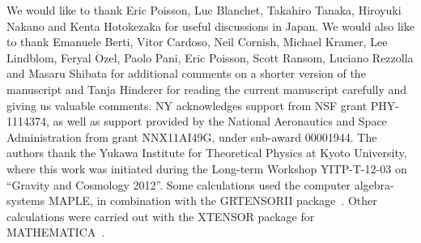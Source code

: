 \documentclass[aps,twocolumn,nofootinbib,showpacs,superscriptaddress,hyperref]{revtex4-1}
\newcommand{\mrm}{\mathrm}
\begin{document}
\acknowledgments
We would like to thank Eric Poisson, Luc Blanchet, Takahiro Tanaka, Hiroyuki Nakano and Kenta Hotokezaka for useful discussions in Japan. We would also like to thank Emanuele Berti, Vitor Cardoso, Neil Cornish, Michael Kramer, Lee Lindblom, Feryal $\ddot{\mrm{O}}$zel, Paolo Pani, Eric Poisson, Scott Ransom, Luciano Rezzolla and Masaru Shibata for additional comments on a shorter version of the manuscript and Tanja Hinderer for reading the current manuscript carefully and giving us valuable comments. NY acknowledges support from NSF grant PHY-1114374, as well as support provided by the National Aeronautics and Space Administration from grant NNX11AI49G, under sub-award 00001944. The authors thank the Yukawa Institute for Theoretical Physics at Kyoto University, where this work was initiated during the Long-term Workshop YITP-T-12-03  on ``Gravity and Cosmology 2012''. Some calculations used the computer algebra-systems MAPLE, in combination with the GRTENSORII package~\cite{grtensor}. Other calculations were carried out with the XTENSOR package for MATHEMATICA~\cite{2008CoPhC.179..586M,2009GReGr..41.2415B}.



\end{document}

